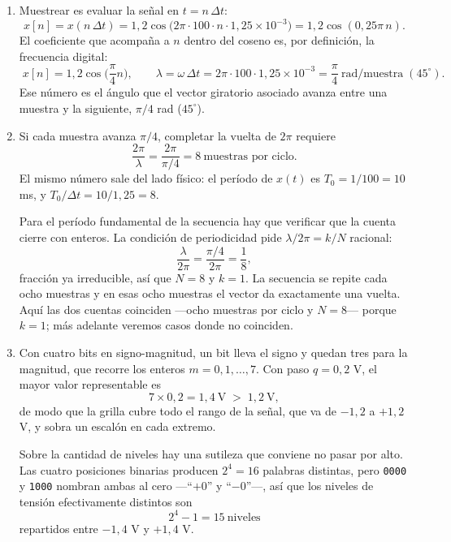 \documentclass[10pt,a4paper]{article}
\begin{document}
	\begin{enumerate}
		\item Muestrear es evaluar la señal en $t = n\,\Delta t$:
		\[
			x[n] = x(n\,\Delta t)
			     = 1{,}2\cos\!\big(2\pi\cdot 100 \cdot n\cdot 1{,}25\times 10^{-3}\big)
			     = 1{,}2\cos(0{,}25\pi\, n).
		\]
		El coeficiente que acompaña a $n$ dentro del coseno es, por definición, la frecuencia
		digital:
		\[
			\boxed{\;x[n] = 1{,}2\cos\!\Big(\frac{\pi}{4}n\Big),
			\qquad \lambda = \omega\,\Delta t = 2\pi\cdot 100\cdot 1{,}25\times10^{-3}
			     = \frac{\pi}{4}\ \text{rad/muestra}\;(45^\circ).\;}
		\]
		Ese número es el ángulo que el vector giratorio asociado avanza entre una muestra y
		la siguiente, $\pi/4$ rad ($45^\circ$).

		\item Si cada muestra avanza $\pi/4$,
		completar la vuelta de $2\pi$ requiere
		\[
			\frac{2\pi}{\lambda} = \frac{2\pi}{\pi/4} = 8 \ \text{muestras por ciclo}.
		\]
		El mismo número sale del lado físico: el período de $x(t)$ es
		$T_0 = 1/100 = 10$ ms, y $T_0/\Delta t = 10/1{,}25 = 8$.

		Para el período fundamental de la secuencia hay que verificar que la cuenta cierre con
		enteros. La condición de periodicidad pide $\lambda/2\pi = k/N$ racional:
		\[
			\frac{\lambda}{2\pi} = \frac{\pi/4}{2\pi} = \frac{1}{8},
		\]
		fracción ya irreducible, así que $N = 8$ y $k = 1$. La secuencia se repite cada ocho
		muestras y en esas ocho muestras el vector da exactamente una vuelta. Aquí las dos
		cuentas coinciden ---ocho muestras por ciclo y $N = 8$--- porque $k=1$; más adelante
		veremos casos donde no coinciden.

		\item Con cuatro bits en signo-magnitud, un bit lleva el signo y
		quedan tres para la magnitud, que recorre los enteros $m = 0, 1, \dots, 7$. Con paso
		$q = 0{,}2$ V, el mayor valor representable es
		\[
			7 \times 0{,}2 = 1{,}4\ \text{V} \;>\; 1{,}2\ \text{V},
		\]
		de modo que la grilla cubre todo el rango de la señal, que va de $-1{,}2$ a
		$+1{,}2$ V, y sobra un escalón en cada extremo.

		Sobre la cantidad de niveles hay una sutileza que conviene no pasar por alto. Las
		cuatro posiciones binarias producen $2^4 = 16$ palabras distintas, pero \texttt{0000}
		y \texttt{1000} nombran ambas al cero ---``$+0$'' y ``$-0$''---, así que los niveles
		de tensión efectivamente distintos son
		\[
			\boxed{\;2^4 - 1 = 15 \ \text{niveles}\;}
		\]
		repartidos entre $-1{,}4$ V y $+1{,}4$ V.


\end{enumerate}
\end{document}
